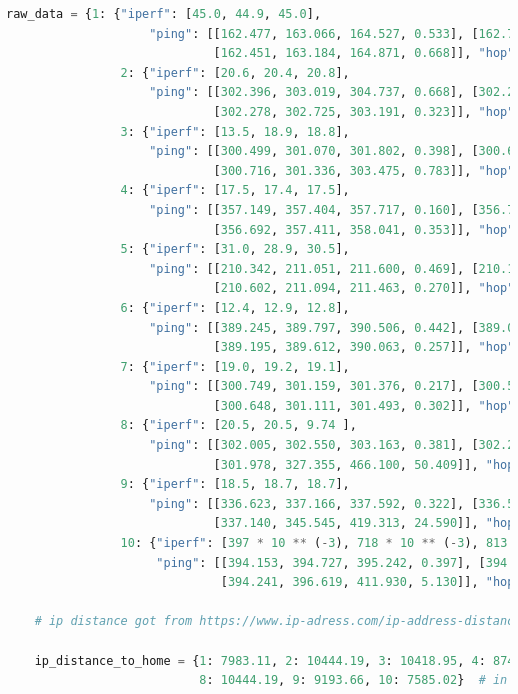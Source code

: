 \documentclass[paper=a4, fontsize=10pt]{scrartcl} %
\numberwithin{equation}{section} %
\numberwithin{figure}{section} %
\numberwithin{table}{section} %
\begin{document}
\begin{lstlisting}[language = python]
    raw_data = {1: {"iperf": [45.0, 44.9, 45.0],
                    "ping": [[162.477, 163.066, 164.527, 0.533], [162.747, 163.405, 166.694, 1.119],
                             [162.451, 163.184, 164.871, 0.668]], "hop": 7},
                2: {"iperf": [20.6, 20.4, 20.8],
                    "ping": [[302.396, 303.019, 304.737, 0.668], [302.236, 302.698, 303.118, 0.279],
                             [302.278, 302.725, 303.191, 0.323]], "hop": 19},
                3: {"iperf": [13.5, 18.9, 18.8],
                    "ping": [[300.499, 301.070, 301.802, 0.398], [300.601, 301.078, 301.560, 0.338],
                             [300.716, 301.336, 303.475, 0.783]], "hop": 18},
                4: {"iperf": [17.5, 17.4, 17.5],
                    "ping": [[357.149, 357.404, 357.717, 0.160], [356.775, 357.301, 358.024, 0.395],
                             [356.692, 357.411, 358.041, 0.353]], "hop": 20},
                5: {"iperf": [31.0, 28.9, 30.5],
                    "ping": [[210.342, 211.051, 211.600, 0.469], [210.165, 211.091, 211.548, 0.392],
                             [210.602, 211.094, 211.463, 0.270]], "hop": 10},
                6: {"iperf": [12.4, 12.9, 12.8],
                    "ping": [[389.245, 389.797, 390.506, 0.442], [389.030, 389.648, 390.562, 0.462],
                             [389.195, 389.612, 390.063, 0.257]], "hop": 17},
                7: {"iperf": [19.0, 19.2, 19.1],
                    "ping": [[300.749, 301.159, 301.376, 0.217], [300.561, 301.269, 302.405, 0.560],
                             [300.648, 301.111, 301.493, 0.302]], "hop": 19},
                8: {"iperf": [20.5, 20.5, 9.74 ],
                    "ping": [[302.005, 302.550, 303.163, 0.381], [302.250, 309.420, 366.028, 18.877],
                             [301.978, 327.355, 466.100, 50.409]], "hop": 19},
                9: {"iperf": [18.5, 18.7, 18.7],
                    "ping": [[336.623, 337.166, 337.592, 0.322], [336.526, 337.301, 337.970, 0.519],
                             [337.140, 345.545, 419.313, 24.590]], "hop": 19},
                10: {"iperf": [397 * 10 ** (-3), 718 * 10 ** (-3), 813 * 10 ** (-3)],
                     "ping": [[394.153, 394.727, 395.242, 0.397], [394.173, 394.601, 395.250, 0.401],
                              [394.241, 396.619, 411.930, 5.130]], "hop": 23}}
    
    # ip distance got from https://www.ip-adress.com/ip-address-distance
    
    ip_distance_to_home = {1: 7983.11, 2: 10444.19, 3: 10418.95, 4: 8743.70, 5: 3241.62, 6: 10418.95, 7: 10292.70,
                           8: 10444.19, 9: 9193.66, 10: 7585.02}  # in miles
    

\end{lstlisting}
\end{document}
